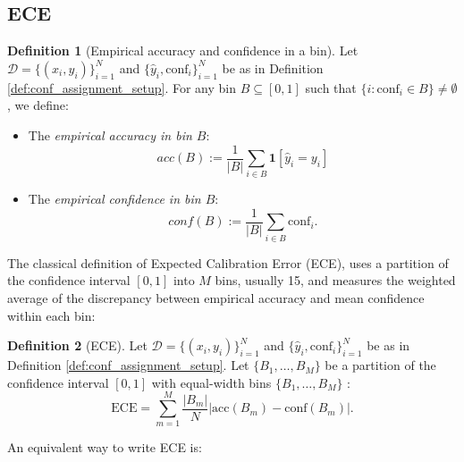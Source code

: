 \documentclass{article}
\theoremstyle{plain}
\theoremstyle{definition}
\newtheorem{definition}{Definition}
\theoremstyle{remark}
\begin{document}
\bigskip


\subsection{ECE}

\bigskip
\begin{definition}[Empirical accuracy and confidence in a bin]
Let $\mathcal{D} = \{(x_i, y_i)\}_{i=1}^N$ and $\{\hat{y}_i, \text{conf}_i\}_{i=1}^N$ be as in Definition \ref{def:conf_assignment_setup}. For any bin $B \subseteq [0,1]$ such that $\{i : \mathrm{conf}_i \in B\} \neq \emptyset$, we define:

\begin{itemize}
    \item The \emph{empirical accuracy in bin $B$}:
    \[
        acc(B)
        :=
        \frac{1}{|B|}\sum_{i \in B} \mathbf{1}[\hat{y}_i = y_i]
    \]

    \item The \emph{empirical confidence in bin $B$}:
    \[
        conf(B)
        :=
        \frac{1}{|B|}\sum_{i \in B} \text{conf}_i.
    \]
\end{itemize}
\end{definition}

The classical definition of Expected Calibration Error (ECE), uses a partition of the confidence interval $[0,1]$ into $M$ bins, usually 15, and measures the weighted average of the discrepancy between empirical accuracy and mean confidence within each bin:
\bigskip

\begin{definition}[ECE]\label{def:ece_bins}
Let $\mathcal{D} = \{(x_i, y_i)\}_{i=1}^N$ and $\{\hat{y}_i, \text{conf}_i\}_{i=1}^N$ be as in Definition \ref{def:conf_assignment_setup}. Let $\{B_1, \ldots, B_M\}$ be a partition of the confidence interval  $[0,1]$ with equal-width bins $\{B_1, \ldots, B_M\}$ : \[
\text{ECE} = \sum_{m=1}^M \frac{|B_m|}{N} \left| \text{acc}(B_m) - \text{conf}(B_m) \right|. 
\]
\end{definition}

An equivalent way to write ECE is:
\bigskip
\end{document}
